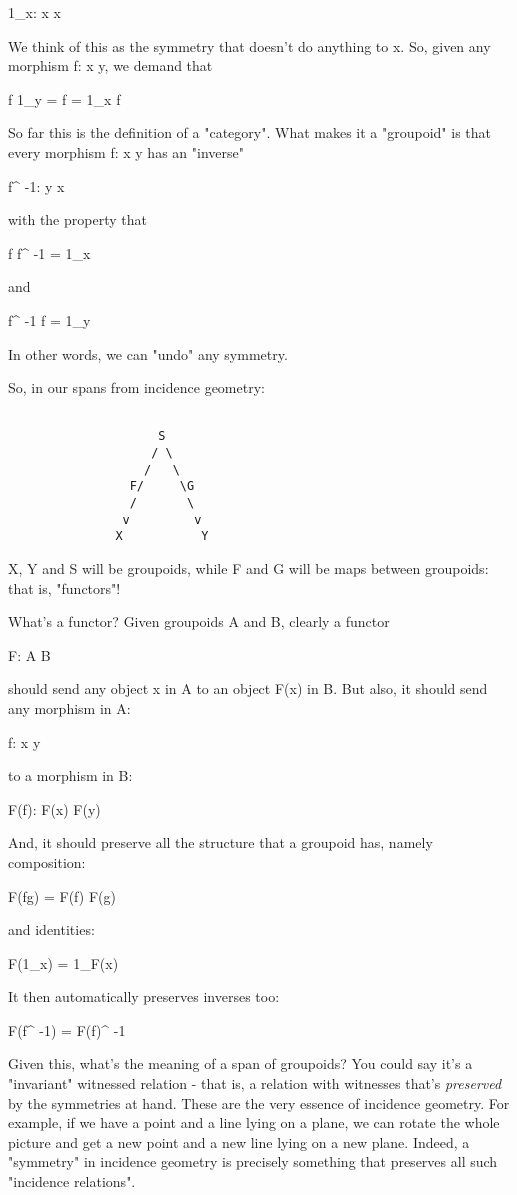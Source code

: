 1_{x}: x \to  x

We think of this as the symmetry that doesn't do anything to x.  
So, given any morphism f: x \to  y, we demand that

f 1_{y} = f = 1_{x} f

So far this is the definition of a "category".  What makes
it a "groupoid" is that every morphism f: x \to  y has an
"inverse"

f^{ -1}: y \to  x

with the property that

f f^{ -1} = 1_{x}

and

f^{ -1} f = 1_{y}

In other words, we can "undo" any symmetry.

So, in our spans from incidence geometry:


\begin{verbatim}

                     S
                    / \
                   /   \
                 F/     \G
                 /       \
                v         v 
               X           Y
\end{verbatim}
    

X, Y and S will be groupoids, while F and G will be maps between 
groupoids: that is, "functors"!

What's a functor?  Given groupoids A and B, clearly a functor 

F: A \to  B

should send any object x in A to an object F(x) in B.  But also, it
should send any morphism in A:

f: x \to  y 

to a morphism in B:

F(f): F(x) \to  F(y)

And, it should preserve all the structure that a groupoid has,
namely composition: 

F(fg) = F(f) F(g)

and identities:

F(1_{x}) = 1_{F(x)}

It then automatically preserves inverses too:

F(f^{ -1}) = F(f)^{ -1}

Given this, what's the meaning of a span of groupoids?  You could say
it's a "invariant" witnessed relation - that is, a relation
with witnesses that's \emph{preserved} by the symmetries at hand.
These are the very essence of incidence geometry.  For example, if we
have a point and a line lying on a plane, we can rotate the whole
picture and get a new point and a new line lying on a new plane.
Indeed, a "symmetry" in incidence geometry is precisely
something that preserves all such "incidence relations".

